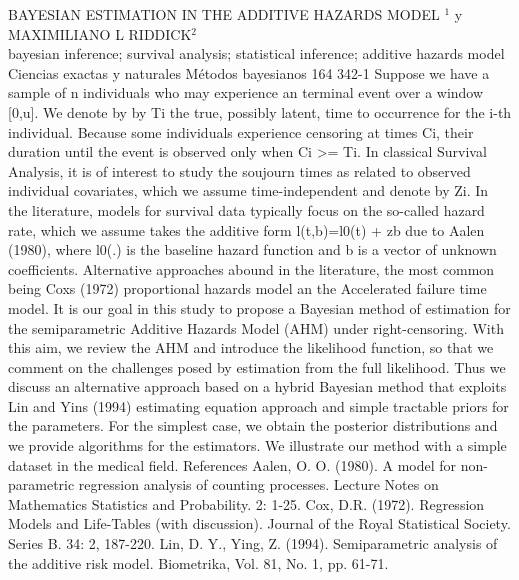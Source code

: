 \A
{BAYESIAN ESTIMATION IN THE ADDITIVE HAZARDS MODEL}
{$^1$ y MAXIMILIANO L RIDDICK$^2$}
{
\\}
{bayesian inference; survival analysis; statistical inference; additive hazards model} 
 {Ciencias exactas y naturales} 
 {Métodos bayesianos} 
 {164} 
 {342-1}
{Suppose we have a sample of n individuals who may experience an terminal event over a window [0,u]. We denote by by Ti the true, possibly latent, time to occurrence for the i-th individual. Because some individuals experience censoring at times Ci, their duration until the event is observed only when Ci >= Ti. In classical Survival Analysis, it is of interest to study the soujourn times as related to observed individual covariates, which we assume time-independent and denote by Zi. In the literature, models for survival data typically focus on the so-called hazard rate, which we assume takes the additive form l(t,b)=l0(t) + zb due to Aalen (1980), where l0(.) is the baseline hazard function and b is a vector of unknown coefficients. Alternative approaches abound in the literature, the most common being Coxs (1972) proportional hazards model an the Accelerated failure time model. It is our goal in this study to propose a Bayesian method of estimation for the semiparametric Additive Hazards Model (AHM) under right-censoring. With this aim, we review the AHM and introduce the likelihood function, so that we comment on the challenges posed by estimation from the full likelihood. Thus we discuss an alternative approach based on a hybrid Bayesian method that exploits Lin and Yins (1994) estimating equation approach and simple tractable priors for the parameters. For the simplest case, we obtain the posterior distributions and we provide algorithms for the estimators. We illustrate our method with a simple dataset in the medical field. References Aalen, O. O. (1980). A model for non-parametric regression analysis of counting processes. Lecture Notes on Mathematics Statistics and Probability. 2: 1-25. Cox, D.R. (1972). Regression Models and Life-Tables (with discussion). Journal of the Royal Statistical Society. Series B. 34: 2, 187-220. Lin, D. Y., Ying, Z. (1994). Semiparametric analysis of the additive risk model. Biometrika, Vol. 81, No. 1, pp. 61-71.}
